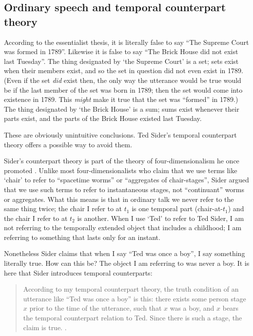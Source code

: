 \documentclass[12pt,twoside]{reedfancy}
\begin{document}
\begin{spacing}{1.25}
\subsection{Ordinary speech and temporal counterpart theory}
\label{counterpart}
According to the essentialist thesis, it is literally false to say
``The Supreme Court was formed in 1789''.  Likewise it is false to say
``The Brick House did not exist last Tuesday''.  The thing designated
by `the Supreme Court' is a set; sets exist when their members exist,
and so the set in question did not even exist in 1789.  (Even if the
set {\em did} exist then, the only way the utterance would be true
would be if the last member of the set was born in 1789; then the set
would come into existence in 1789.  This {\em might} make it true that
the set was ``formed'' in 1789.)  The thing designated by `the Brick
House' is a sum; sums exist whenever their parts exist, and the parts
of the Brick House existed last Tuesday.

These are obviously unintuitive conclusions.  Ted Sider's temporal
counterpart theory offers a possible way to avoid them.

Sider's counterpart theory is part of the theory of
four-dimensionalism he once promoted \citeyearpar{sider2001}.  Unlike
most four-dimensionalists who claim that we use terms like `chair' to
refer to ``spacetime worms'' or ``aggregates of chair-stages'', Sider
argued that we use such terms to refer to instantaneous stages, not
``continuant'' worms or aggregates.  What this means is that in
ordinary talk we never refer to the same thing twice; the chair I
refer to at $t_1$ is one temporal part (chair-at-$t_1$) and the chair
I refer to at $t_2$ is another.  When I use `Ted' to refer to Ted
Sider, I am not referring to the temporally extended object that
includes a childhood; I am referring to something that lasts only for
an instant.

Nonetheless Sider claims that when I say ``Ted was once a boy'', I say
something literally true.  How can this be?  The object I am referring
to was never a boy.  It is here that Sider introduces temporal
counterparts:

\begin{quote}
According to my temporal counterpart theory, the truth condition of an
utterance like ``Ted was once a boy'' is this: there exists some
person stage $x$ prior to the time of the utterance, such that $x$ was
a boy, and $x$ bears the temporal counterpart relation to Ted.  Since
there is such a stage, the claim is
true. \citeyearpar[193]{sider2001}.
\end{quote}


\end{spacing}
\end{document}
